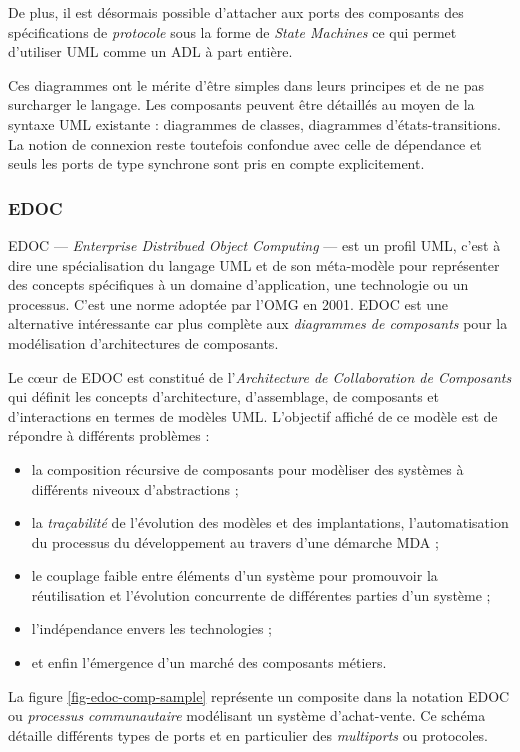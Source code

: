 De plus, il est d\'esormais possible d'attacher aux ports des
composants des sp\'ecifications de \emph{protocole} sous la forme de
\emph{State Machines} ce qui permet d'utiliser \textsf{UML} comme un \textsf{ADL} \`a
part enti\`ere. 

Ces diagrammes ont le m\'erite d'\^etre simples dans leurs principes
et de ne pas surcharger le langage. Les composants peuvent \^etre
d\'etaill\'es au moyen de la syntaxe \textsf{UML} existante :
diagrammes de classes, diagrammes d'\'etats-transitions. La notion
de connexion reste toutefois confondue avec celle de d\'ependance et
seuls les ports de type synchrone sont pris en compte
explicitement. 

\subsubsection{EDOC}
\label{sec:edoc}
\textsf{EDOC} --- \emph{Enterprise Distribued Object Computing} ---
est  un profil UML, c'est \`a dire une
sp\'ecialisation du langage UML et de son m\'eta-mod\`ele pour
repr\'esenter des concepts sp\'ecifiques \`a un domaine
d'application, une technologie ou un processus. C'est une norme
adopt\'ee par l'\textsf{OMG} en 2001. \textsf{EDOC} est une
alternative int\'eressante car plus compl\`ete aux \emph{diagrammes
  de composants} pour la mod\'elisation d'architectures de
composants. 

Le c\oe ur de \textsf{EDOC} est constitu\'e de l'\emph{Architecture de Collaboration
de Composants}  qui d\'efinit les concepts
d'architecture, d'assemblage, de composants et d'interactions en
termes de mod\`eles \textsf{UML}. L'objectif affich\'e de ce mod\`ele est de
r\'epondre \`a diff\'erents probl\`emes : 
\begin{itemize}
  \item la composition r\'ecursive de composants pour mod\`eliser des
    syst\`emes \`a diff\'erents niveoux d'abstractions ;
  \item  la
    \emph{tra\c{c}abilit\'e} de l'\'evolution des mod\`eles et des
    implantations, l'automatisation du processus du d\'eveloppement
    au travers d'une d\'emarche \textsf{MDA} ;
  \item  le couplage faible
    entre \'el\'ements d'un syst\`eme pour promouvoir la
    r\'eutilisation et l'\'evolution concurrente de diff\'erentes
    parties d'un syst\`eme ;
  \item  l'ind\'ependance envers les technologies ;
    \item et enfin l'\'emergence d'un march\'e des composants m\'etiers.
\end{itemize}
La figure \ref{fig-edoc-comp-sample} repr\'esente un
composite dans la notation \textsf{EDOC} ou \emph{processus
communautaire}  mod\'elisant un syst\`eme
d'achat-vente. Ce sch\'ema d\'etaille diff\'erents types de ports et
en particulier des \emph{multiports} ou protocoles.

